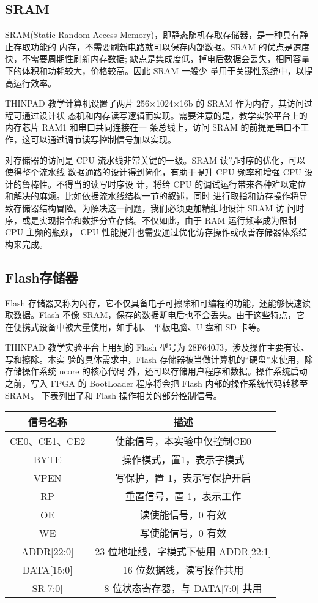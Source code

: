 \documentclass[11pt,utf8]{article}
\begin{document}
\subsection{SRAM}
SRAM(Static Random Access Memory)，即静态随机存取存储器，是一种具有静止存取功能的 内存，不需要刷新电路就可以保存内部数据。SRAM 的优点是速度快，不需要周期性刷新内存数据; 缺点是集成度低，掉电后数据会丢失，相同容量下的体积和功耗较大，价格较高。因此 SRAM 一般少 量用于关键性系统中，以提高运行效率。

THINPAD 教学计算机设置了两片 256×1024×16b 的 SRAM 作为内存，其访问过程可通过设计状 态机和内存读写逻辑而实现。需要注意的是，教学实验平台上的内存芯片 RAM1 和串口共同连接在一 条总线上，访问 SRAM 的前提是串口不工作，这可以通过调节读写控制信号加以实现。

对存储器的访问是 CPU 流水线非常关键的一级。SRAM 读写时序的优化，可以使得整个流水线 数据通路的设计得到简化，有助于提升 CPU 频率和增强 CPU 设计的鲁棒性。不得当的读写时序设 计，将给 CPU 的调试运行带来各种难以定位和解决的麻烦。比如依据流水线结构一节的叙述，同时 进行取指和访存操作将导致存储器结构冒险。为解决这一问题，我们必须更加精细地设计 SRAM 访 问时序，或是实现指令和数据分立存储。不仅如此，由于 RAM 运行频率成为限制 CPU 主频的瓶颈， CPU 性能提升也需要通过优化访存操作或改善存储器体系结构来完成。
\subsection{Flash存储器}
Flash 存储器又称为闪存，它不仅具备电子可擦除和可编程的功能，还能够快速读取数据。Flash 不像 SRAM，保存的数据断电后也不会丢失。由于这些特点，它在便携式设备中被大量使用，如手机、 平板电脑、U 盘和 SD 卡等。

THINPAD 教学实验平台上用到的 Flash 型号为 28F640J3，涉及操作主要有读、写和擦除。本实 验的具体需求中，Flash 存储器被当做计算机的“硬盘”来使用，除存储操作系统 ucore 的核心代码 外，还可以存储用户程序和数据。操作系统启动之前，写入 FPGA 的 BootLoader 程序将会把 Flash 内部的操作系统代码转移至 SRAM。
下表列出了和 Flash 操作相关的部分控制信号。
\begin{center}
\begin{tabular}{|c|c|}
\hline
\textbf{信号名称} & \textbf{描述} \\
\hline
CE0、CE1、CE2 & 使能信号，本实验中仅控制CE0 \\
BYTE & 操作模式，置1，表示字模式 \\
VPEN & 写保护，置 1，表示写保护开启 \\
RP & 重置信号，置 1，表示工作 \\
OE & 读使能信号，0 有效 \\
WE & 写使能信号，0 有效 \\
ADDR[22:0] & 23 位地址线，字模式下使用 ADDR[22:1] \\
DATA[15:0] & 16 位数据线，读写操作共用 \\
SR[7:0] & 8 位状态寄存器，与 DATA[7:0] 共用 \\
\hline
\end{tabular}
\end{center}
\end{document}
